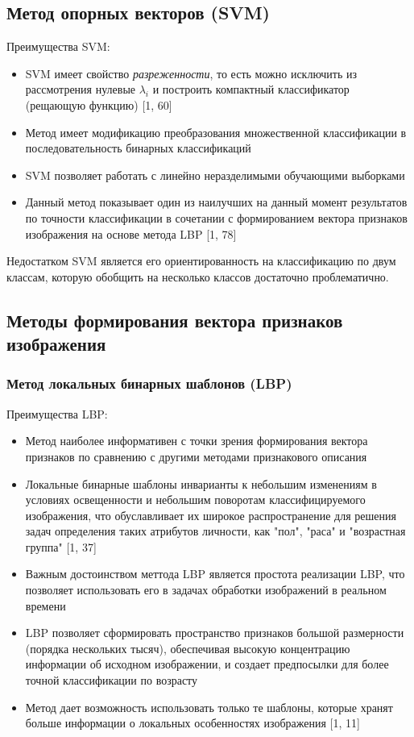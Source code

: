 \documentclass[main.tex]{subfiles}
\begin{document}
\subsection{Метод опорных векторов (SVM)}
Преимущества SVM:
\begin{itemize}
    \item SVM имеет свойство \textit{разреженности}, то есть можно исключить из рассмотрения нулевые $\lambda_i$ и построить компактный классификатор (рещающую функцию) [1, 60]
    \item Метод имеет модификацию преобразования множественной классификации в последовательность бинарных классификаций
    \item SVM позволяет работать с линейно неразделимыми обучающими выборками
    \item Данный метод показывает один из наилучших на данный момент результатов по точности классификации в сочетании с формированием вектора признаков изображения на основе метода LBP [1, 78]
\end{itemize}

Недостатком SVM является его ориентированность на классификацию по двум классам, которую обобщить на несколько классов достаточно проблематично.

\subsection{Методы формирования вектора признаков изображения}
\subsubsection{Метод локальных бинарных шаблонов (LBP)}
Преимущества LBP:
\begin{itemize}
    \item Метод наиболее информативен с точки зрения формирования вектора признаков по сравнению с другими методами признакового описания
    \item Локальные бинарные шаблоны инварианты к небольшим изменениям в условиях освещенности и небольшим поворотам классифицируемого изображения, что обуславливает их широкое распространение для решения задач определения таких атрибутов личности, как "пол", "раса" и "возрастная группа" [1, 37]
    \item Важным достоинством меттода LBP является простота реализации LBP, что позволяет использовать его в задачах обработки изображений в реальном времени
    \item LBP позволяет сформировать пространство признаков большой размерности (порядка нескольких тысяч), обеспечивая высокую концентрацию информации об исходном изображении, и создает предпосылки для более точной классификации по возрасту
    \item Метод дает возможность использовать только те шаблоны, которые хранят больше информации о локальных особенностях изображения [1, 11]
\end{itemize}
\end{document}
